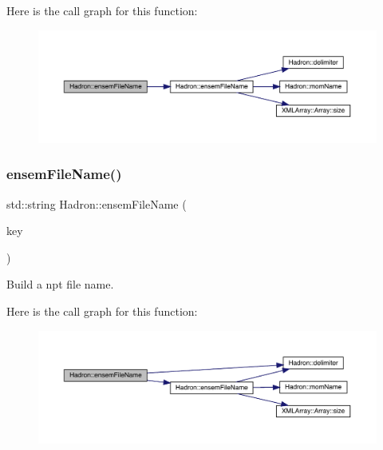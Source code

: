 Here is the call graph for this function\+:
\nopagebreak
\begin{figure}[H]
\begin{center}
\leavevmode
\includegraphics[width=350pt]{d1/daf/namespaceHadron_aa7a6f1af8bf69b8a63890e92bfaaf738_cgraph}
\end{center}
\end{figure}
\mbox{\label{namespaceHadron_a535351e28134f75011451a8b7b5f7cb4}} 
\subsubsection{\texorpdfstring{ensemFileName()}{ensemFileName()}\hspace{0.1cm}{\footnotesize\ttfamily [12/12]}}
{\footnotesize\ttfamily std\+::string Hadron\+::ensem\+File\+Name (\begin{DoxyParamCaption}\item[{const \mbox{\hyperlink{structHadron_1_1KeyHadronSUNNPartNPtCorr__t}{Hadron\+::\+Key\+Hadron\+S\+U\+N\+N\+Part\+N\+Pt\+Corr\+\_\+t}} \&}]{key }\end{DoxyParamCaption})}



Build a npt file name. 

Here is the call graph for this function\+:
\nopagebreak
\begin{figure}[H]
\begin{center}
\leavevmode
\includegraphics[width=350pt]{d1/daf/namespaceHadron_a535351e28134f75011451a8b7b5f7cb4_cgraph}
\end{center}
\end{figure}
\mbox{\label{namespaceHadron_a0b8fc65d4da647ad0c70885da63e157e}} 
